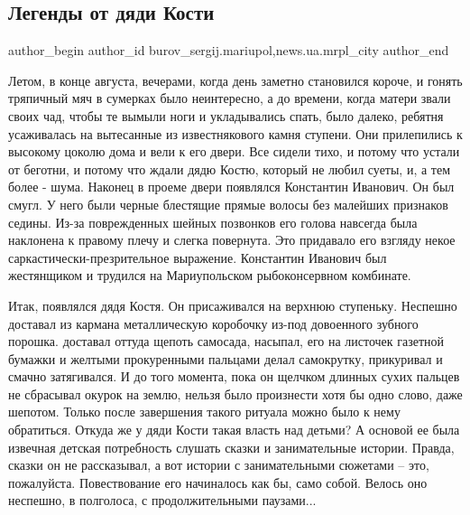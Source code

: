  
 
 
 
 
 
\subsection{Легенды от дяди Кости}
\label{sec:03_06_2017.stz.news.ua.mrpl_city.1.legendy_ot_djadi_kosti}
 
\ifcmt
 author_begin
   author_id burov_sergij.mariupol,news.ua.mrpl_city
 author_end
\fi


Летом, в конце августа, вечерами, когда день заметно становился короче, и
гонять тряпичный мяч в сумерках было неинтересно, а до времени, когда матери
звали своих чад, чтобы те вымыли ноги и укладывались спать, было далеко,
ребятня усаживалась на вытесанные из известнякового камня ступени. Они
прилепились к высокому цоколю дома и вели к его двери. Все сидели тихо, и
потому что устали от беготни, и потому что ждали дядю Костю, который не любил
суеты, и, а тем более - шума. Наконец в проеме двери появлялся Константин
Иванович. Он был смугл. У него были черные блестящие прямые волосы без малейших
признаков седины. Из-за поврежденных шейных позвонков его голова навсегда была
наклонена к правому плечу и слегка повернута. Это придавало его взгляду некое
саркастически-презрительное выражение.  Константин Иванович был жестянщиком и
трудился на Мариупольском рыбоконсервном комбинате.

Итак, появлялся дядя Костя. Он присаживался на верхнюю ступеньку. Неспешно
доставал из кармана металлическую коробочку из-под довоенного зубного порошка.
доставал оттуда щепоть самосада, насыпал, его на листочек газетной бумажки и
желтыми прокуренными пальцами делал самокрутку, прикуривал и смачно
затягивался. И до того момента, пока он щелчком длинных сухих пальцев не
сбрасывал окурок на землю, нельзя было произнести хотя бы одно слово, даже
шепотом. Только после завершения такого ритуала можно было к нему обратиться.
Откуда же у дяди Кости такая власть над детьми? А основой ее была извечная
детская потребность слушать сказки и занимательные истории. Правда, сказки он
не рассказывал, а вот истории с занимательными сюжетами – это, пожалуйста.
Повествование его начиналось как бы, само собой. Велось оно неспешно, в
полголоса, с продолжительными паузами... 

